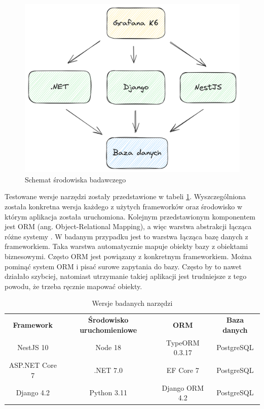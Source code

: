 \begin{figure}[!hb]
	\centering \includegraphics[width=1\linewidth]{rysunki/framework_benchmark_schema.png}
	\caption{Schemat środowiska badawczego}
	\label{rys:docker_schema}
\end{figure}



Testowane wersje narzędzi zostały przedstawione w tabeli \ref{table:version}.
Wyszczególniona została konkretna wersja każdego z użytych frameworków oraz środowisko w którym aplikacja została uruchomiona.
Kolejnym przedstawionym komponentem jest ORM (ang. Object-Relational Mapping), a więc warstwa abstrakcji łącząca różne systemy \cite{5365905}.
W badanym przypadku jest to warstwa łącząca bazę danych z frameworkiem.
Taka warstwa automatycznie mapuje obiekty bazy z obiektami biznesowymi.
Często ORM jest powiązany z konkretnym frameworkiem.
Można pominąć system ORM i pisać surowe zapytania do bazy.
Często by to nawet działało szybciej, natomiast utrzymanie takiej aplikacji jest trudniejsze z tego powodu, że trzeba ręcznie mapować obiekty.

\begin{center}
	\begin{table}[h!]
	\begin{tabular}{ |c|c|c|c| } 
		\hline
		\textbf{Framework} & \textbf{Środowisko uruchomieniowe} & \textbf{ORM} & \textbf{Baza danych} \\ 
		NestJS 10 & Node 18 & TypeORM 0.3.17 & PostgreSQL \\
		ASP.NET Core 7 & .NET 7.0 & EF Core 7 & PostgreSQL \\ 
		Django 4.2 & Python 3.11 & Django ORM 4.2 & PostgreSQL \\
		\hline
	\end{tabular}
	\caption{Wersje badanych narzędzi}
	\label{table:version}
	\end{table}
\end{center}




